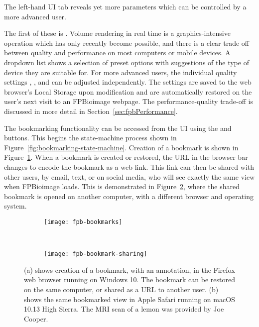 The left-hand UI tab reveals yet more parameters which can be controlled by a more advanced user.

The first of these is .
Volume rendering in real time is a graphics-intensive operation which has only recently become possible, and there is a clear trade off between quality and performance on most computers or mobile devices.
A dropdown list shows a selection of preset options with suggestions of the type of device they are suitable for.
For more advanced users, the individual quality settings , , and  can be adjusted independently.
The  settings are saved to the web browser's Local Storage upon modification and are automatically restored on the user's next visit to an FPBioimage webpage.
The performance-quality trade-off is discussed in more detail in Section~\ref{sec:fpbPerformance}.

The bookmarking functionality can be accessed from the UI using the  and  buttons.
This begins the state-machine process shown in Figure~\ref{fig:bookmarking-state-machine}.
Creation of a bookmark is shown in Figure~\ref{fig:fpbBookmarkCreation}.
When a bookmark is created or restored, the URL in the browser bar changes to encode the bookmark as a web link.
This link can then be shared with other users, by email, text, or on social media, who will see exactly the same view when FPBioimage loads.
This is demonstrated in Figure~\ref{fig:fpbBookmarkRecieved}, where the shared bookmark is opened on another computer, with a different browser and operating system.

\begin{figure}[htbp!]
\centering
\centering
\begin{subfigure}[b]{1.0\textwidth}
\texttt{[image: fpb-bookmarks]}
\caption{} \label{fig:fpbBookmarkCreation}
\end{subfigure}

~\newline
\begin{subfigure}[b]{1.0\textwidth}
\texttt{[image: fpb-bookmark-sharing]}
\caption{} \label{fig:fpbBookmarkRecieved}
\end{subfigure}
\caption[FPBioimage: Bookmarks can be shared as a URL for another user to open]{(a) shows creation of a bookmark, with an annotation, in the Firefox web browser running on Windows 10. The bookmark can be restored on the same computer, or shared as a URL to another user. (b) shows the same bookmarked view in Apple Safari running on macOS 10.13 High Sierra. The MRI scan of a lemon was provided by Joe Cooper. }
\label{fig:fpbBookmarks}
\end{figure}

